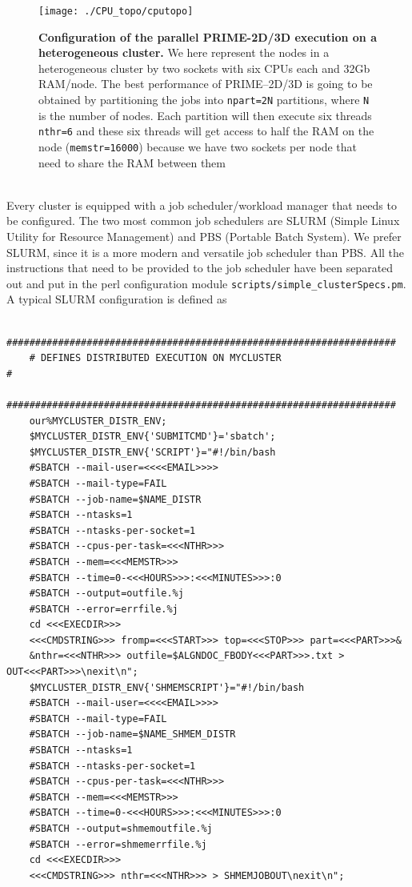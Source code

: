 \documentclass[a4paper,11pt]{article}
\begin{document}
\begin{figure}
\texttt{[image: ./CPU\_topo/cputopo]}
\caption{\textbf{Configuration of the parallel PRIME-2D/3D execution on a heterogeneous cluster.} We here represent the nodes in  a heterogeneous cluster by two sockets with six CPUs each and 32Gb RAM/node. The best performance of PRIME--2D/3D is going to be obtained by partitioning  the jobs into \texttt{npart=2N} partitions, where \texttt{N} is the number of nodes. Each partition will then execute six threads \texttt{nthr=6} and these six threads will get access to half the RAM on the node (\texttt{memstr=16000}) because we have two sockets per node that need to share the RAM between them}
\end{figure}
\\Every cluster is equipped with a job scheduler/workload manager that needs to be configured. The two most common job schedulers are SLURM (Simple Linux Utility for Resource Management) and PBS (Portable Batch System). We prefer SLURM, since it is a more modern and versatile job scheduler than PBS. All the instructions that need to be provided to the job scheduler have been separated out and put in the perl configuration module \texttt{scripts/simple\_clusterSpecs.pm}. A typical SLURM configuration is defined as
\begin{verbatim}
    ####################################################################
    # DEFINES DISTRIBUTED EXECUTION ON MYCLUSTER                       #
    ####################################################################
    our%MYCLUSTER_DISTR_ENV;
    $MYCLUSTER_DISTR_ENV{'SUBMITCMD'}='sbatch';
    $MYCLUSTER_DISTR_ENV{'SCRIPT'}="#!/bin/bash
    #SBATCH --mail-user=<<<<EMAIL>>>>
    #SBATCH --mail-type=FAIL
    #SBATCH --job-name=$NAME_DISTR
    #SBATCH --ntasks=1
    #SBATCH --ntasks-per-socket=1
    #SBATCH --cpus-per-task=<<<NTHR>>>
    #SBATCH --mem=<<<MEMSTR>>>
    #SBATCH --time=0-<<<HOURS>>>:<<<MINUTES>>>:0
    #SBATCH --output=outfile.%j
    #SBATCH --error=errfile.%j
    cd <<<EXECDIR>>> 
    <<<CMDSTRING>>> fromp=<<<START>>> top=<<<STOP>>> part=<<<PART>>>&
    &nthr=<<<NTHR>>> outfile=$ALGNDOC_FBODY<<<PART>>>.txt > OUT<<<PART>>>\nexit\n";
    $MYCLUSTER_DISTR_ENV{'SHMEMSCRIPT'}="#!/bin/bash
    #SBATCH --mail-user=<<<<EMAIL>>>>
    #SBATCH --mail-type=FAIL
    #SBATCH --job-name=$NAME_SHMEM_DISTR
    #SBATCH --ntasks=1
    #SBATCH --ntasks-per-socket=1
    #SBATCH --cpus-per-task=<<<NTHR>>>
    #SBATCH --mem=<<<MEMSTR>>>
    #SBATCH --time=0-<<<HOURS>>>:<<<MINUTES>>>:0
    #SBATCH --output=shmemoutfile.%j
    #SBATCH --error=shmemerrfile.%j
    cd <<<EXECDIR>>> 
    <<<CMDSTRING>>> nthr=<<<NTHR>>> > SHMEMJOBOUT\nexit\n";
\end{verbatim}
\end{document}

